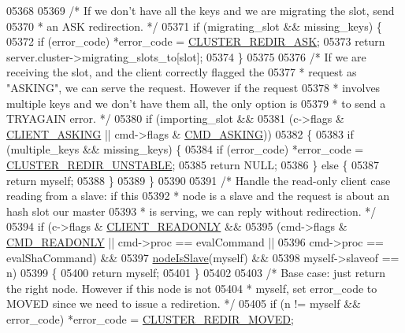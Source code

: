 \begin{DoxyCode}
{{{{{{{{{{{{{{{{{{{{{{{{{{{{{{{{{{{{{{{{{{{{{{{{{{{{{{{{{{{{{{{{{{{{{{{{{{{{{{{{{{{{{{{{{{{{{{{{{{{{{{{{{{{{{05368 
05369     \textcolor{comment}{/* If we don't have all the keys and we are migrating the slot, send}
05370 \textcolor{comment}{     * an ASK redirection. */}
05371     \textcolor{keywordflow}{if} (migrating\_slot && missing\_keys) \{
05372         \textcolor{keywordflow}{if} (error\_code) *error\_code = \hyperlink{cluster_8h_ae93f7d31db8c46cdf4c6a7e2f15fd00b}{CLUSTER\_REDIR\_ASK};
05373         \textcolor{keywordflow}{return} server.cluster->migrating\_slots\_to[slot];
05374     \}
05375 
05376     \textcolor{comment}{/* If we are receiving the slot, and the client correctly flagged the}
05377 \textcolor{comment}{     * request as "ASKING", we can serve the request. However if the request}
05378 \textcolor{comment}{     * involves multiple keys and we don't have them all, the only option is}
05379 \textcolor{comment}{     * to send a TRYAGAIN error. */}
05380     \textcolor{keywordflow}{if} (importing\_slot &&
05381         (c->flags & \hyperlink{server_8h_a108ac316dfd847430daf3c97f28557d3}{CLIENT\_ASKING} || cmd->flags & \hyperlink{server_8h_af0b13ef0f1dabe404fd7d904cb66b548}{CMD\_ASKING}))
05382     \{
05383         \textcolor{keywordflow}{if} (multiple\_keys && missing\_keys) \{
05384             \textcolor{keywordflow}{if} (error\_code) *error\_code = \hyperlink{cluster_8h_a55ae67727361b72bce02b01dd58511f2}{CLUSTER\_REDIR\_UNSTABLE};
05385             \textcolor{keywordflow}{return} NULL;
05386         \} \textcolor{keywordflow}{else} \{
05387             \textcolor{keywordflow}{return} myself;
05388         \}
05389     \}
05390 
05391     \textcolor{comment}{/* Handle the read-only client case reading from a slave: if this}
05392 \textcolor{comment}{     * node is a slave and the request is about an hash slot our master}
05393 \textcolor{comment}{     * is serving, we can reply without redirection. */}
05394     \textcolor{keywordflow}{if} (c->flags & \hyperlink{server_8h_a84ba0494755e2f4f0faf6017175b5e0a}{CLIENT\_READONLY} &&
05395         (cmd->flags & \hyperlink{server_8h_a7e9c728f228e1c82ae1e22173375abcf}{CMD\_READONLY} || cmd->proc == evalCommand ||
05396          cmd->proc == evalShaCommand) &&
05397         \hyperlink{cluster_8h_a3c99881f6892130c902b42b1f84a0e11}{nodeIsSlave}(myself) &&
05398         myself->slaveof == n)
05399     \{
05400         \textcolor{keywordflow}{return} myself;
05401     \}
05402 
05403     \textcolor{comment}{/* Base case: just return the right node. However if this node is not}
05404 \textcolor{comment}{     * myself, set error\_code to MOVED since we need to issue a rediretion. */}
05405     \textcolor{keywordflow}{if} (n != myself && error\_code) *error\_code = \hyperlink{cluster_8h_a26a42bb5d79b437e3a8329d66d7fce81}{CLUSTER\_REDIR\_MOVED};
}}}}}}}}}}}}}}}}}}}}}}}}}}}}}}}}}}}}}}}}}}}}}}}}}}}}}}}}}}}}}}}}}}}}}}}}}}}}}}}}}}}}}}}}}}}}}}}}}}}}}}}}}}}}}
\end{DoxyCode}
